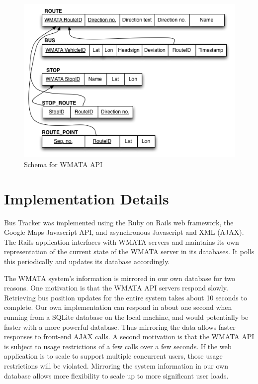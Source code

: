 \documentclass[12pt]{report}
\begin{document}
\begin{figure}[ht]
  \centerline{\includegraphics[scale=0.6]{bus-schema.png}}
  \caption{Schema for WMATA API}
  \label{fig:busSchema}
\end{figure}


\chapter{Implementation Details}

Bus Tracker was implemented using the Ruby on Rails web framework, the Google Maps Javascript API, and asynchronous Javascript and XML (AJAX).  The Rails application interfaces with WMATA servers and maintains its own representation of the current state of the WMATA server in its databases.  It polls this periodically and updates its database accordingly.

The WMATA system's information is mirrored in our own database for two reasons.  One motivation is that the WMATA API servers respond slowly.  Retrieving bus position updates for the entire system takes about 10 seconds to complete.  Our own implementation can respond in about one second when running from a SQLite database on the local machine, and would potentially be faster with a more powerful database.  Thus mirroring the data allows faster responses to front-end AJAX calls.  A second motivation is that the WMATA API is subject to usage restrictions of a few calls over a few seconds.  If the web application is to scale to support multiple concurrent users, those usage restrictions will be violated.  Mirroring the system information in our own database allows more flexibility to scale up to more significant user loads. 
\end{document}
